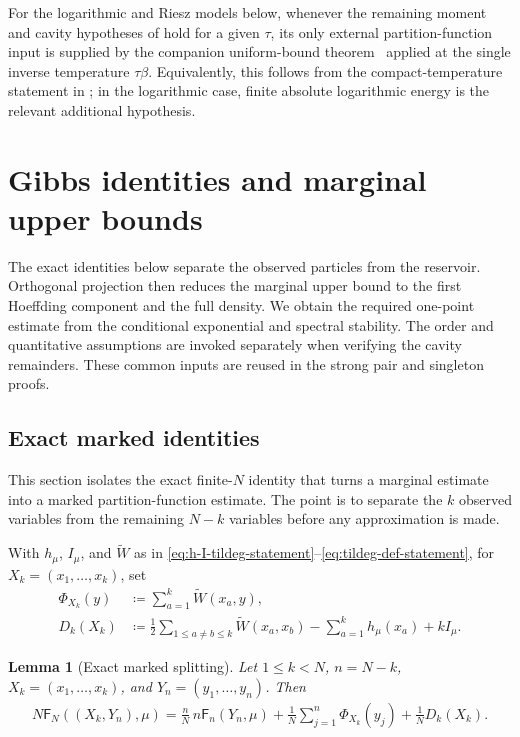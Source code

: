 \documentclass[11pt,reqno]{amsart}
\numberwithin{equation}{section}
\theoremstyle{plain}
\newtheorem{lemma}[lemma]{Lemma}
\theoremstyle{remark}
\newcommand{\tl}{\widetilde}
\newcommand{\Fr}{{\mathsf{F}}}
\newcommand{\Xk}{X_k}
\newcommand{\be}{\beta}
\begin{document}
For the logarithmic and Riesz models below, whenever the remaining moment and cavity hypotheses of  hold for a given \(\tau\), its only external partition-function input is supplied by the companion uniform-bound theorem~\cite[Theorem~2.2\textup{(i)}]{DGR26} applied at the single inverse temperature \(\tau\be\).  Equivalently, this follows from the compact-temperature statement in \cite[Corollary~5.7]{DGR26}; in the logarithmic case, finite absolute logarithmic energy is the relevant additional hypothesis.

\section{Gibbs identities and marginal upper bounds}
\label{sec:gibbs-identities-upper-bounds}\label{sec:one-point-upper-estimate}

The exact identities below separate the observed particles from the reservoir.  Orthogonal projection then reduces the marginal upper bound to the first Hoeffding component and the full density.  We obtain the required one-point estimate from the conditional exponential and spectral stability.  The order and quantitative assumptions are invoked separately when verifying the cavity remainders.  These common inputs are reused in the strong pair and singleton proofs.

\subsection{Exact marked identities}
\label{sec:exact-marked-identities}

This section isolates the exact finite-\(N\) identity that turns a
marginal estimate into a marked partition-function estimate.  The point is to
separate the \(k\) observed variables from the remaining \(N-k\) variables before
any approximation is made.

With \(h_\mu\), \(I_\mu\), and \(\tl W\) as in \eqref{eq:h-I-tildeg-statement}--\eqref{eq:tildeg-def-statement}, for
\(\Xk=(x_1,\ldots,x_k)\), set
\begin{align}
 \Phi_{\Xk}(y)&\coloneqq \sum_{a=1}^k\tl W(x_a,y),\label{eq:Phi-x-def}\\
 D_k(\Xk)&\coloneqq \frac12\sum_{1\le a\ne b\le k}\tl W(x_a,x_b)-\sum_{a=1}^k h_\mu(x_a)+kI_\mu.\label{eq:Dk-def}
\end{align}

\begin{lemma}[Exact marked splitting]\label{lem:exact-splitting}
Let \(1\le k<N\), \(n=N-k\), \(\Xk=(x_1,\ldots,x_k)\), and \(Y_n=(y_1,\ldots,y_n)\).  Then
\begin{align}\label{eq:exact-splitting}
N\Fr_N((\Xk,Y_n),\mu)
=\frac{n}{N}\,n\Fr_n(Y_n,\mu)
+\frac1N\sum_{j=1}^n\Phi_{\Xk}(y_j)
+\frac1N D_k(\Xk).
\end{align}
\end{lemma}
\end{document}
